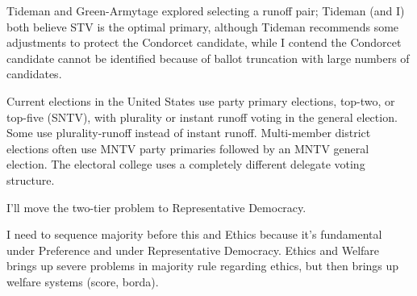 \begin{boxcomment}
    Tideman and Green-Armytage explored selecting a runoff pair; Tideman (and I) both believe STV is the optimal primary, although Tideman recommends some adjustments to protect the Condorcet candidate, while I contend the Condorcet candidate cannot be identified because of ballot truncation with large numbers of candidates.

    Current elections in the United States use party primary elections, top-two, or top-five (SNTV), with plurality or instant runoff voting in the general election.  Some use plurality-runoff instead of instant runoff.  Multi-member district elections often use MNTV party primaries followed by an MNTV general election.  The electoral college uses a completely different delegate voting structure.
\end{boxcomment}

\begin{boxcomment}
    I'll move the two-tier problem to Representative Democracy.

    I need to sequence majority before this and Ethics because it's fundamental under Preference and under Representative Democracy.  Ethics and Welfare brings up severe problems in majority rule regarding ethics, but then brings up welfare systems (score, borda).
\end{boxcomment}

%




